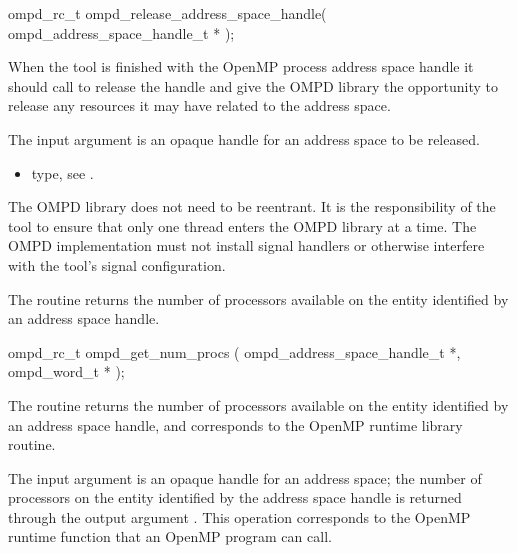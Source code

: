 \format

\cspecificstart
\begin{ompSyntax}
ompd_rc_t ompd_release_address_space_handle(
  ompd_address_space_handle_t *
);
\end{ompSyntax}
\cspecificend


\descr
When the tool is finished with the OpenMP process address space handle it
should call  to release
the handle and give the OMPD library the opportunity to release
any resources it may have related to the address space.

\argdesc
The input argument  is an opaque handle for an address space
to be released.

\crossreferences	
\begin{itemize}
	\item {} type, see 
	.
\end{itemize}


The OMPD library does not need to be reentrant. It is the responsibility 
of the tool to ensure that only one thread enters the OMPD library at a time. The OMPD 
implementation must not install signal handlers or otherwise interfere with the tool's signal 
configuration.



\label{ompd:ompd_get_num_procs}
\summary
The  routine returns the number of processors
available on the entity identified by an address space handle.

\format

\cspecificstart
\begin{ompSyntax}
ompd_rc_t ompd_get_num_procs (
  ompd_address_space_handle_t *,
  ompd_word_t *
);
\end{ompSyntax}
\cspecificend


\descr
The  routine returns the number of processors
available on the entity identified by an address space handle, and corresponds to the
 OpenMP runtime library routine.

\argdesc
The input argument  is an opaque handle for an address space;
the number of processors on the entity identified by the address space
handle is returned through the output argument .
This operation corresponds to the OpenMP runtime function
 that an OpenMP program can call.

